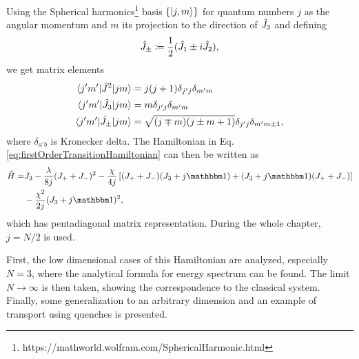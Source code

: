 Using the Spherical harmonics\footnote{https://mathworld.wolfram.com/SphericalHarmonic.html} basis $\{\ket{j,m}\}$ for quantum numbers $j$ as the angular momentum and $m$ its projection to the direction of $\hat{J}_3$ and defining
\begin{equation}
    \hat{J}_\pm\coloneqq\frac{1}{2}(\hat{J}_1\pm i\hat{J}_2),
\end{equation}
we get matrix elements
\begin{align}
    \braket{j'm'|\hat{J}^2|jm} &= j(j+1)\delta_{j'j}\delta_{m'm}\\
    \braket{j'm'|\hat{J}_3|jm} &= m \delta_{j'j}\delta_{m'm}\\
    \braket{j'm'|\hat{J}_\pm|jm} &= \sqrt{(j\mp m)(j\pm m+1)}\delta_{j'j}\delta_{m'm\pm 1},
\end{align}
where $\delta_{a'b}$ is Kronecker delta. The Hamiltonian in Eq. \ref{eq:firstOrderTransitionHamiltonian} can then be written as
\begin{equation}
\begin{split}
        \HH =& J_3-\frac{\lambda}{8j}(J_++J_-)^2-\frac{\chi}{4j}\left[(J_++J_-)(J_3+j\Id)+(J_3+j\Id)(J_++J_-)\right]\\
        &-\frac{\chi^2}{2j}(J_3+j\Id)^2,
\end{split}
\end{equation}
which has pentadiagonal matrix representation. During the whole chapter, $j=N/2$ is used. 

First, the low dimensional cases of this Hamiltonian are analyzed, especially $N=3$, where the analytical formula for energy spectrum can be found. The limit $N\rightarrow \infty$ is then taken, showing the correspondence to the classical system. Finally, some generalization to an arbitrary dimension and an example of transport using quenches is presented. 











